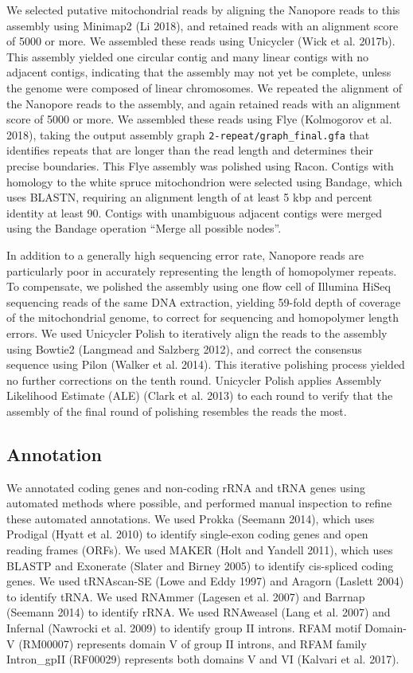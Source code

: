 \documentclass[
  12pt,
  oneside,
  openany]{book}
\begin{document}
We selected putative mitochondrial reads by aligning the Nanopore reads to this assembly using Minimap2 (Li 2018), and retained reads with an alignment score of 5000 or more. We assembled these reads using Unicycler (Wick et al. 2017b). This assembly yielded one circular contig and many linear contigs with no adjacent contigs, indicating that the assembly may not yet be complete, unless the genome were composed of linear chromosomes. We repeated the alignment of the Nanopore reads to the assembly, and again retained reads with an alignment score of 5000 or more. We assembled these reads using Flye (Kolmogorov et al. 2018), taking the output assembly graph \texttt{2-repeat/graph\_final.gfa} that identifies repeats that are longer than the read length and determines their precise boundaries. This Flye assembly was polished using Racon. Contigs with homology to the white spruce mitochondrion were selected using Bandage, which uses BLASTN, requiring an alignment length of at least 5 kbp and percent identity at least 90. Contigs with unambiguous adjacent contigs were merged using the Bandage operation ``Merge all possible nodes''.

In addition to a generally high sequencing error rate, Nanopore reads are particularly poor in accurately representing the length of homopolymer repeats. To compensate, we polished the assembly using one flow cell of Illumina HiSeq sequencing reads of the same DNA extraction, yielding 59-fold depth of coverage of the mitochondrial genome, to correct for sequencing and homopolymer length errors. We used Unicycler Polish to iteratively align the reads to the assembly using Bowtie2 (Langmead and Salzberg 2012), and correct the consensus sequence using Pilon (Walker et al. 2014). This iterative polishing process yielded no further corrections on the tenth round. Unicycler Polish applies Assembly Likelihood Estimate (ALE) (Clark et al. 2013) to each round to verify that the assembly of the final round of polishing resembles the reads the most.

\hypertarget{annotation}{%
\subsection{Annotation}\label{annotation}}

We annotated coding genes and non-coding rRNA and tRNA genes using automated methods where possible, and performed manual inspection to refine these automated annotations. We used Prokka (Seemann 2014), which uses Prodigal (Hyatt et al. 2010) to identify single-exon coding genes and open reading frames (ORFs). We used MAKER (Holt and Yandell 2011), which uses BLASTP and Exonerate (Slater and Birney 2005) to identify cis-spliced coding genes. We used tRNAscan-SE (Lowe and Eddy 1997) and Aragorn (Laslett 2004) to identify tRNA. We used RNAmmer (Lagesen et al. 2007) and Barrnap (Seemann 2014) to identify rRNA. We used RNAweasel (Lang et al. 2007) and Infernal (Nawrocki et al. 2009) to identify group II introns. RFAM motif Domain-V (RM00007) represents domain V of group II introns, and RFAM family Intron\_gpII (RF00029) represents both domains V and VI (Kalvari et al. 2017).
\end{document}

